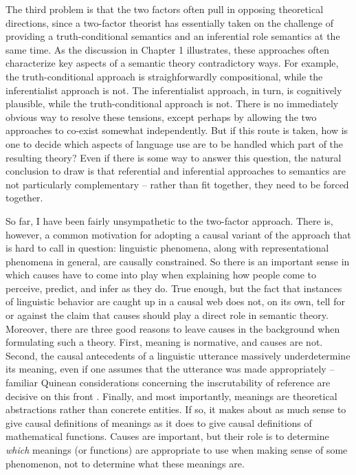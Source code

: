 The third problem is that the two factors often pull in opposing theoretical directions, since a two-factor theorist has essentially taken on the challenge of providing a truth-conditional semantics and an inferential role semantics at the same time. As the discussion in Chapter 1 illustrates, these approaches often characterize key aspects of a semantic theory contradictory ways. For example, the truth-conditional approach is straighforwardly compositional, while the inferentialist approach is not. The inferentialist approach, in turn, is cognitively plausible, while the truth-conditional approach is not. There is no immediately obvious way to resolve these tensions, except perhaps by allowing the two approaches to co-exist somewhat independently. But if this route is taken, how is one to decide which aspects of language use are to be handled which part of the resulting theory? Even if there is some way to answer this question, the natural conclusion to draw is that referential and inferential approaches to semantics are not particularly complementary -- rather than fit together, they need to be forced together. 

So far, I have been fairly unsympathetic to the two-factor approach. There is, however, a common motivation for adopting a causal variant of the approach that is hard to call in question: linguistic phenomena, along with representational phenomena in general, are causally constrained. So there is an important sense in which causes have to come into play when explaining how people come to perceive, predict, and infer as they do. True enough, but the fact that instances of linguistic behavior are caught up in a causal web does not, on its own, tell for or against the claim that causes should play a direct role in semantic theory. Moreover, there are three good reasons to leave causes in the background when formulating such a theory. First, meaning is normative, and causes are not. Second, the causal antecedents of a linguistic utterance massively underdetermine its meaning, even if one assumes that the utterance was made appropriately -- familiar Quinean considerations concerning the inscrutability of reference are decisive on this front \citep{Dennett:1991,Horwich:2005}. Finally, and most importantly, meanings are theoretical abstractions rather than concrete entities. If so, it makes about as much sense to give causal definitions of meanings as it does to give causal definitions of mathematical functions. Causes are important, but their role is to determine \textit{which} meanings (or functions) are appropriate to use when making sense of some phenomenon, not to determine what these meanings are. 

